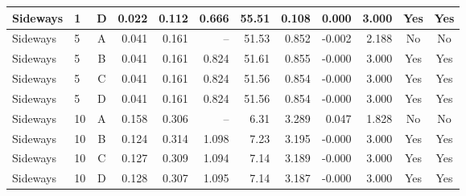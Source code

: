 \begin{table}[!t]
\begin{tabular}{@{}llcrrrrrrrcc@{}}
Sideways & 1 & D & 0.022 & 0.112 & 0.666 & 55.51 & 0.108 & 0.000 & 3.000 & Yes & Yes\\
\midrule
Sideways & 5 & A & 0.041 & 0.161 & -- & 51.53 & 0.852 & -0.002 & 2.188 & No & No\\
Sideways & 5 & B & 0.041 & 0.161 & 0.824 & 51.61 & 0.855 & -0.000 & 3.000 & Yes & Yes\\
Sideways & 5 & C & 0.041 & 0.161 & 0.824 & 51.56 & 0.854 & -0.000 & 3.000 & Yes & Yes\\
Sideways & 5 & D & 0.041 & 0.161 & 0.824 & 51.56 & 0.854 & -0.000 & 3.000 & Yes & Yes\\
\midrule
Sideways & 10 & A & 0.158 & 0.306 & -- & 6.31 & 3.289 & 0.047 & 1.828 & No & No\\
Sideways & 10 & B & 0.124 & 0.314 & 1.098 & 7.23 & 3.195 & -0.000 & 3.000 & Yes & Yes\\
Sideways & 10 & C & 0.127 & 0.309 & 1.094 & 7.14 & 3.189 & -0.000 & 3.000 & Yes & Yes\\
Sideways & 10 & D & 0.128 & 0.307 & 1.095 & 7.14 & 3.187 & -0.000 & 3.000 & Yes & Yes\\
\bottomrule\end{tabular}\end{table}
